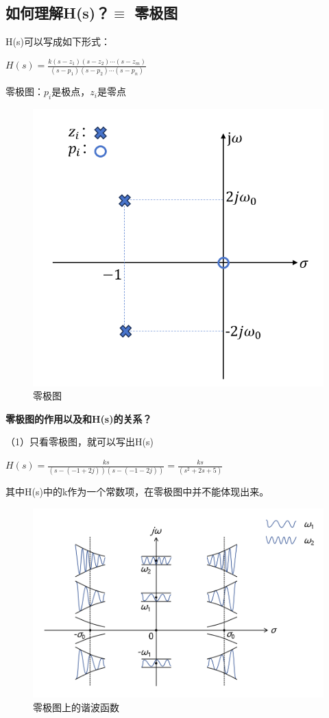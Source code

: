 \documentclass[UTF8]{ctexart}
\begin{document}
\subsection{如何理解H(s)？$\equiv $ 零极图 }
H(s)可以写成如下形式：\par
\qquad $H(s)=\frac{k(s-z_1)(s-z_2)\cdots (s-z_m)}{(s-p_1)(s-p_2)\cdots (s-p_n)} $\par  
零极图：$p_i$是极点，$z_i$是零点 \par  
\begin{figure}[h]
    \centering         %
    \includegraphics[scale=0.40]{1.png}
    \caption{零极图}
\end{figure}
\textbf{零极图的作用以及和H(s)的关系？} \par
（1）只看零极图，就可以写出H(s)\par
$H(s)=\frac{ks}{(s-(-1+2j))(s-(-1-2j))} =\frac{ks}{(s^2+2s+5)}$ \par
其中H(s)中的k作为一个常数项，在零极图中并不能体现出来。\par
\begin{figure}[h]
    \centering         %
    \includegraphics[scale=0.45]{2.png}
    \caption{零极图上的谐波函数}
\end{figure}
\end{document}
